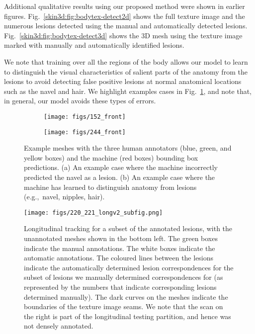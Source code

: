 \documentclass[journal]{IEEEtran}
\def\eg{e.g.,~}
\begin{document}
Additional qualitative results using our proposed method were shown in earlier figures. Fig.~\ref{skin3d:fig:bodytex-detect2d} shows the full texture image and the numerous lesions detected using the manual and automatically detected lesions. Fig.~\ref{skin3d:fig:bodytex-detect3d} shows the 3D mesh using the texture image marked with manually and automatically identified lesions. 

We note that training over all the regions of the body allows our model to learn to distinguish the visual characteristics of salient parts of the anatomy from the lesions to avoid detecting false positive lesions at normal anatomical locations such as the navel and hair. We highlight examples cases in Fig.~\ref{skin3d:fig:bodytex-multi-example}, and note that, in general, our model avoids these types of errors.

\begin{figure}[htb]
\centering
\begin{subfigure}[b]{0.49\linewidth}
\texttt{[image: figs/152\_front]}
\caption{}
\end{subfigure}
\begin{subfigure}[b]{0.49\linewidth}
\texttt{[image: figs/244\_front]}
\caption{}
\end{subfigure}
\caption{Example meshes with the three human annotators (blue, green, and yellow boxes) and the machine (red boxes) bounding box predictions. (a) An example case where the machine incorrectly predicted the navel as a lesion. (b) An example case where the machine has learned to distinguish anatomy from lesions (\eg navel, nipples, hair).}
\label{skin3d:fig:bodytex-multi-example}
\end{figure}


\begin{figure*}[htb]
\centering
\texttt{[image: figs/220\_221\_longv2\_subfig.png]}
\caption{Longitudinal tracking for a subset of the annotated lesions, with the unannotated meshes shown in the bottom left. The green boxes indicate the manual annotations. The white boxes indicate the automatic annotations. The coloured lines between the lesions indicate the automatically determined lesion correspondences for the subset of lesions we manually determined correspondences for (as represented by the numbers that indicate corresponding lesions determined manually). The dark curves on the meshes indicate the boundaries of the texture image seams. We note that the scan on the right is part of the longitudinal testing partition, and hence was not densely annotated.}
\label{skin3d:fig:bodytex-long}
\end{figure*}
\end{document}
